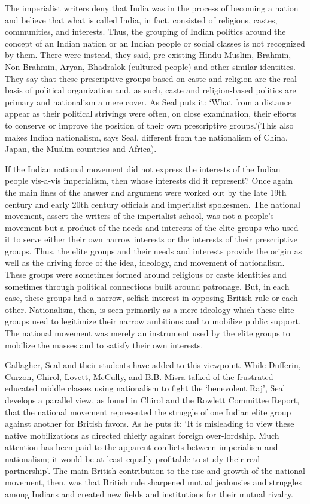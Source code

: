 \begin{multicols}{2}
The imperialist writers deny that India was in the process of becoming a nation and believe that what is called India, in fact, consisted of religions, castes, communities, and interests. Thus, the grouping of Indian politics around the concept of an Indian nation or an Indian people or social classes is not recognized by them. There were instead, they said, pre-existing Hindu-Muslim, Brahmin, Non-Brahmin, Aryan, Bhadralok (cultured people) and other similar identities. They say that these prescriptive groups based on caste and religion are the real basis of political organization and, as such, caste and religion-based politics are primary and nationalism a mere cover. As Seal puts it: `What from a distance appear as their political strivings were often, on close examination, their efforts to conserve or improve the position of their own prescriptive groups.'(This also makes Indian nationalism, says Seal, different from the nationalism of China, Japan, the Muslim countries and Africa).

If the Indian national movement did not express the interests of the Indian people vis-a-vis imperialism, then whose interests did it represent? Once again the main lines of the answer and argument were worked out by the late 19th century and early 20th century officials and imperialist spokesmen. The national movement, assert the writers of the imperialist school, was not a people's movement but a product of the needs and interests of the elite groups who used it to serve either their own narrow interests or the interests of their prescriptive groups. Thus, the elite groups and their needs and interests provide the origin as well as the driving force of the idea, ideology, and movement of nationalism. These groups were sometimes formed around religious or caste identities and sometimes through political connections built around patronage. But, in each case, these groups had a narrow, selfish interest in opposing British rule or each other. Nationalism, then, is seen primarily as a mere ideology which these elite groups used to legitimize their narrow ambitions and to mobilize public support. The national movement was merely an instrument used by the elite groups to mobilize the masses and to satisfy their own interests.

Gallagher, Seal and their students have added to this viewpoint. While Dufferin, Curzon, Chirol, Lovett, McCully, and B.B. Misra talked of the frustrated educated middle classes using nationalism to fight the `benevolent Raj', Seal develops a parallel view, as found in Chirol and the Rowlett Committee Report, that the national movement represented the struggle of one Indian elite group against another for British favors. As he puts it: `It is misleading to view these native mobilizations as directed chiefly against foreign over-lordship. Much attention has been paid to the apparent conflicts between imperialism and nationalism; it would be at least equally profitable to study their real partnership'. The main British contribution to the rise and growth of the national movement, then, was that British rule sharpened mutual jealousies and struggles among Indians and created new fields and institutions for their mutual rivalry.


\end{multicols}
